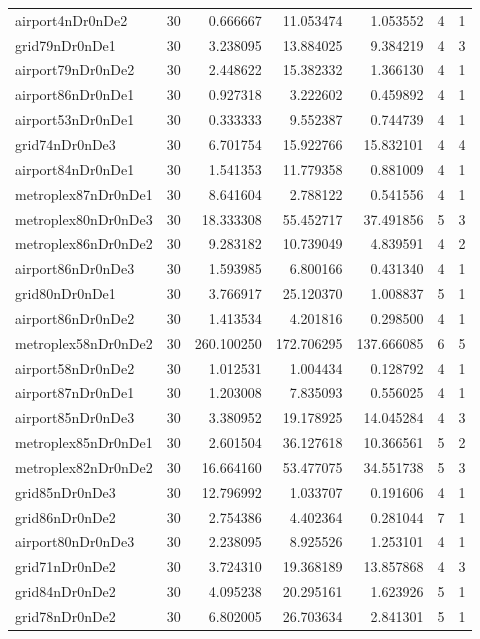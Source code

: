\documentclass[../../../thesis.tex]{subfiles}
\begin{document}
\begin{longtable}{|l|r|r|r|r|r|r|}
airport4nDr0nDe2 & 30 & 0.666667 & 11.053474 & 1.053552 & 4 & 1 \\
grid79nDr0nDe1 & 30 & 3.238095 & 13.884025 & 9.384219 & 4 & 3 \\
airport79nDr0nDe2 & 30 & 2.448622 & 15.382332 & 1.366130 & 4 & 1 \\
airport86nDr0nDe1 & 30 & 0.927318 & 3.222602 & 0.459892 & 4 & 1 \\
airport53nDr0nDe1 & 30 & 0.333333 & 9.552387 & 0.744739 & 4 & 1 \\
grid74nDr0nDe3 & 30 & 6.701754 & 15.922766 & 15.832101 & 4 & 4 \\
airport84nDr0nDe1 & 30 & 1.541353 & 11.779358 & 0.881009 & 4 & 1 \\
metroplex87nDr0nDe1 & 30 & 8.641604 & 2.788122 & 0.541556 & 4 & 1 \\
metroplex80nDr0nDe3 & 30 & 18.333308 & 55.452717 & 37.491856 & 5 & 3 \\
metroplex86nDr0nDe2 & 30 & 9.283182 & 10.739049 & 4.839591 & 4 & 2 \\
airport86nDr0nDe3 & 30 & 1.593985 & 6.800166 & 0.431340 & 4 & 1 \\
grid80nDr0nDe1 & 30 & 3.766917 & 25.120370 & 1.008837 & 5 & 1 \\
airport86nDr0nDe2 & 30 & 1.413534 & 4.201816 & 0.298500 & 4 & 1 \\
metroplex58nDr0nDe2 & 30 & 260.100250 & 172.706295 & 137.666085 & 6 & 5 \\
airport58nDr0nDe2 & 30 & 1.012531 & 1.004434 & 0.128792 & 4 & 1 \\
airport87nDr0nDe1 & 30 & 1.203008 & 7.835093 & 0.556025 & 4 & 1 \\
airport85nDr0nDe3 & 30 & 3.380952 & 19.178925 & 14.045284 & 4 & 3 \\
metroplex85nDr0nDe1 & 30 & 2.601504 & 36.127618 & 10.366561 & 5 & 2 \\
metroplex82nDr0nDe2 & 30 & 16.664160 & 53.477075 & 34.551738 & 5 & 3 \\
grid85nDr0nDe3 & 30 & 12.796992 & 1.033707 & 0.191606 & 4 & 1 \\
grid86nDr0nDe2 & 30 & 2.754386 & 4.402364 & 0.281044 & 7 & 1 \\
airport80nDr0nDe3 & 30 & 2.238095 & 8.925526 & 1.253101 & 4 & 1 \\
grid71nDr0nDe2 & 30 & 3.724310 & 19.368189 & 13.857868 & 4 & 3 \\
grid84nDr0nDe2 & 30 & 4.095238 & 20.295161 & 1.623926 & 5 & 1 \\
grid78nDr0nDe2 & 30 & 6.802005 & 26.703634 & 2.841301 & 5 & 1 \\

\end{longtable}
\end{document}
